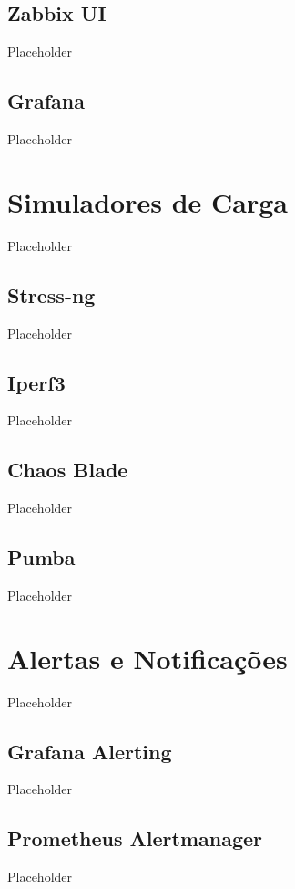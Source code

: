 \subsection{Zabbix UI}
Placeholder

\subsection{Grafana}
Placeholder

\section{Simuladores de Carga}
Placeholder

\subsection{Stress-ng}
Placeholder

\subsection{Iperf3}
Placeholder

\subsection{Chaos Blade}
Placeholder

\subsection{Pumba}
Placeholder

\section{Alertas e Notificações}
Placeholder

\subsection{Grafana Alerting}
Placeholder

\subsection{Prometheus Alertmanager}
Placeholder
